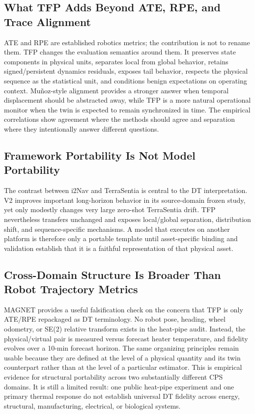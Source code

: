 \documentclass[journal]{IEEEtran}
\begin{document}
\subsection{What TFP Adds Beyond ATE, RPE, and Trace Alignment}
ATE and RPE are established robotics metrics; the contribution is not to rename them. TFP changes the evaluation semantics around them. It preserves state components in physical units, separates local from global behavior, retains signed/persistent dynamics residuals, exposes tail behavior, respects the physical sequence as the statistical unit, and conditions benign expectations on operating context. Mu\~noz-style alignment provides a stronger answer when temporal displacement should be abstracted away, while TFP is a more natural operational monitor when the twin is expected to remain synchronized in time. The empirical correlations show agreement where the methods should agree and separation where they intentionally answer different questions.

\subsection{Framework Portability Is Not Model Portability}
The contrast between i2Nav and TerraSentia is central to the DT interpretation. V2 improves important long-horizon behavior in its source-domain frozen study, yet only modestly changes very large zero-shot TerraSentia drift. TFP nevertheless transfers unchanged and exposes local/global separation, distribution shift, and sequence-specific mechanisms. A model that executes on another platform is therefore only a portable template until asset-specific binding and validation establish that it is a faithful representation of that physical asset.


\subsection{Cross-Domain Structure Is Broader Than Robot Trajectory Metrics}
MAGNET provides a useful falsification check on the concern that TFP is only ATE/RPE repackaged as DT terminology. No robot pose, heading, wheel odometry, or SE(2) relative transform exists in the heat-pipe audit. Instead, the physical/virtual pair is measured versus forecast heater temperature, and fidelity evolves over a 10-min forecast horizon. The same organizing principles remain usable because they are defined at the level of a physical quantity and its twin counterpart rather than at the level of a particular estimator. This is empirical evidence for structural portability across two substantially different CPS domains. It is still a limited result: one public heat-pipe experiment and one primary thermal response do not establish universal DT fidelity across energy, structural, manufacturing, electrical, or biological systems.
\end{document}
